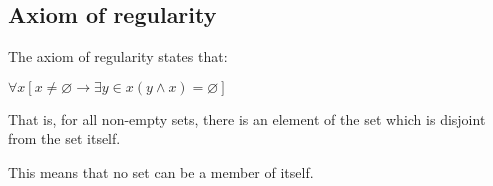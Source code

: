 
\subsection{Axiom of regularity}

The axiom of regularity states that:

\(\forall x[x\ne \varnothing \rightarrow \exists y \in x (y\land x )=\varnothing]\)

That is, for all non-empty sets, there is an element of the set which is disjoint from the set itself.

This means that no set can be a member of itself.

